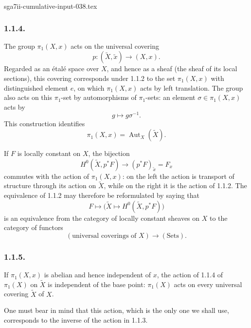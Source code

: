 \begin{filecontents*}{sga7ii-cumulative-input-038.tex}
\subsubsection*{1.1.4.}
The group $\pi_1(X,x)$ acts on the universal covering
\[
p:(\widetilde X,\widetilde x)\longrightarrow(X,x).
\]
Regarded as an \'etal\'e space over $X$, and hence as a sheaf (the
sheaf of its local sections), this covering corresponds under 1.1.2
to the set $\pi_1(X,x)$ with distinguished element $e$, on which
$\pi_1(X,x)$ acts by left translation.  The group also acts on this
$\pi_1$-set by automorphisms of $\pi_1$-sets: an element
$\sigma\in\pi_1(X,x)$ acts by
\[
g\longmapsto g\sigma^{-1}.
\]
This construction identifies
\[
\pi_1(X,x)=\operatorname{Aut}_X(\widetilde X).
\]

If $F$ is locally constant on $X$, the bijection
\begin{equation}\tag{1.1.4.1}
H^0(\widetilde X,p^*F)
\longrightarrow(p^*F)_{\widetilde x}=F_x
\end{equation}
commutes with the action of $\pi_1(X,x)$: on the left the action is
transport of structure through its action on $\widetilde X$, while on
the right it is the action of 1.1.2.  The equivalence of 1.1.2 may
therefore be reformulated by saying that
\[
F\longmapsto
\bigl(\widetilde X\longmapsto
H^0(\widetilde X,p^*F)\bigr)
\]
is an equivalence from the category of locally constant sheaves on
$X$ to the category of functors
\[
(\text{universal coverings of }X)\longrightarrow(\mathrm{Sets}).
\]

\subsubsection*{1.1.5.}
If $\pi_1(X,x)$ is abelian and hence independent of $x$, the action
of 1.1.4 of $\pi_1(X)$ on $\widetilde X$ is independent of the base
point: $\pi_1(X)$ acts on every universal covering $\widetilde X$ of
$X$.

One must bear in mind that this action, which is the only one we shall
use, corresponds to the inverse of the action in 1.1.3.
\end{filecontents*}
